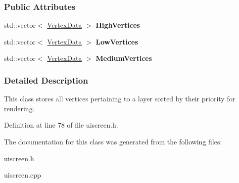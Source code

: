 \subsubsection*{Public Attributes}
\begin{DoxyCompactItemize}
\item 
\hypertarget{classMezzanine_1_1UI_1_1ScreenVertexData_a48440b317351698559914b697b3b42c7}{
std::vector$<$ \hyperlink{structMezzanine_1_1UI_1_1VertexData}{VertexData} $>$ {\bfseries HighVertices}}
\label{classMezzanine_1_1UI_1_1ScreenVertexData_a48440b317351698559914b697b3b42c7}

\item 
\hypertarget{classMezzanine_1_1UI_1_1ScreenVertexData_ace3435e0e344f93ab7889d1233a70eca}{
std::vector$<$ \hyperlink{structMezzanine_1_1UI_1_1VertexData}{VertexData} $>$ {\bfseries LowVertices}}
\label{classMezzanine_1_1UI_1_1ScreenVertexData_ace3435e0e344f93ab7889d1233a70eca}

\item 
\hypertarget{classMezzanine_1_1UI_1_1ScreenVertexData_a117a3524d342f22024e98da16721ec76}{
std::vector$<$ \hyperlink{structMezzanine_1_1UI_1_1VertexData}{VertexData} $>$ {\bfseries MediumVertices}}
\label{classMezzanine_1_1UI_1_1ScreenVertexData_a117a3524d342f22024e98da16721ec76}

\end{DoxyCompactItemize}


\subsubsection{Detailed Description}
This class stores all vertices pertaining to a layer sorted by their priority for rendering. 

Definition at line 78 of file uiscreen.h.



The documentation for this class was generated from the following files:\begin{DoxyCompactItemize}
\item 
uiscreen.h\item 
uiscreen.cpp\end{DoxyCompactItemize}
